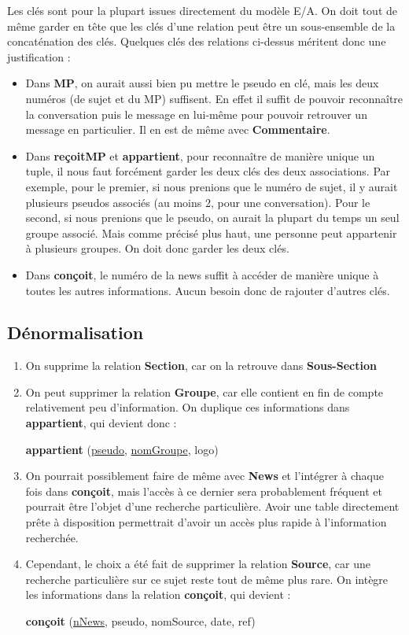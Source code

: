 \medskip
Les clés sont pour la plupart issues directement du modèle E/A. On doit tout de même garder en tête que les clés d'une relation peut être un sous-ensemble de la concaténation des clés. Quelques clés des relations ci-dessus méritent donc une justification :
\begin{itemize}
	\item Dans \textbf{MP}, on aurait aussi bien pu mettre le pseudo en clé, mais les deux numéros (de sujet et du MP) suffisent. En effet il suffit de pouvoir reconnaître la conversation puis le message en lui-même pour pouvoir retrouver un message en particulier. Il en est de même avec \textbf{Commentaire}.
	\item Dans \textbf{reçoitMP} et \textbf{appartient}, pour reconnaître de manière unique un tuple, il nous faut forcément garder les deux clés des deux associations. Par exemple, pour le premier, si nous prenions que le numéro de sujet, il y aurait plusieurs pseudos associés (au moins 2, pour une conversation). Pour le second, si nous prenions que le pseudo, on aurait la plupart du temps un seul groupe associé. Mais comme précisé plus haut, une personne peut appartenir à plusieurs groupes. On doit donc garder les deux clés.
	\item Dans \textbf{conçoit}, le numéro de la news suffit à accéder de manière unique à toutes les autres informations. Aucun besoin donc de rajouter d'autres clés.
\end{itemize}

\subsection{Dénormalisation}
\begin{enumerate}
	\item On supprime la relation \textbf{Section}, car on la retrouve dans \textbf{Sous-Section}
	\item On peut supprimer la relation \textbf{Groupe}, car elle contient en fin de compte relativement peu d'information. On duplique ces informations dans \textbf{appartient}, qui devient donc :
	\begin{center} \textbf{appartient}  (\underline{pseudo}, \underline{nomGroupe}, logo) \end{center}
	
	\item On pourrait possiblement faire de même avec \textbf{News} et l'intégrer à chaque fois dans \textbf{conçoit}, mais l'accès à ce dernier sera probablement fréquent et pourrait être l'objet d'une recherche particulière. Avoir une table directement prête à disposition permettrait d'avoir un accès plus rapide à l'information recherchée.
	\item Cependant, le choix a été fait de supprimer la relation \textbf{Source}, car une recherche particulière sur ce sujet reste tout de même plus rare. On intègre les informations dans la relation \textbf{conçoit}, qui devient :
	\begin{center} \textbf{conçoit} (\underline{n\degree News}, pseudo, nomSource, date, ref)\end{center}
\end{enumerate}

